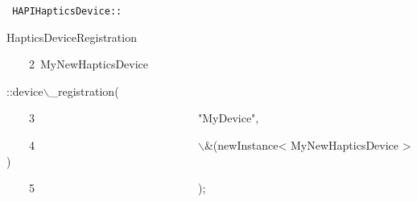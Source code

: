 {
\tt
{HAPIHapticsDevice}{\hlsym ::}{\hlstd HapticsDeviceRegistration\leavevmode\par
{\hlline \ \ \ \ 2\ }MyNewHapticsDevice}{\hlsym ::}{\hlstd device$\backslash$\_{}registration}{\hlsym (}\leavevmode\par
{\hlline \ \ \ \ 3\ }{\hlstd }{\hlstd\ \ \ \ \ \ \ \ \ \ \ \ \ \ \ \ \ \ \ \ \ \ \ \ \ \ \ \ }{\hlstd }{\hlstr "MyDevice"}{\hlstd }{\hlsym ,}\leavevmode\par
{\hlline \ \ \ \ 4\ }{\hlstd }{\hlstd\ \ \ \ \ \ \ \ \ \ \ \ \ \ \ \ \ \ \ \ \ \ \ \ \ \ \ \ }{\hlstd $\backslash$\&}{\hlsym (}{\hlstd newInstance}{\hlsym $\mathord{<}$ }{\hlstd MyNewHapticsDevice }{\hlsym $\mathord{>}$)}\leavevmode\par
{\hlline \ \ \ \ 5\ }{\hlstd }{\hlstd\ \ \ \ \ \ \ \ \ \ \ \ \ \ \ \ \ \ \ \ \ \ \ \ \ \ \ \ }{\hlstd }{\hlsym );}{\hlstd }\leavevmode\par
}
